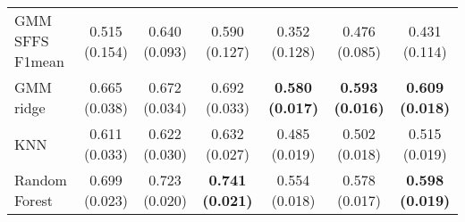 \documentclass[a4paper,10pt,DIV=16]{scrartcl}
\begin{document}
\begin{table}[!t]
\begin{tabular}{lcccccc}
            GMM SFFS F1mean & 0.515 (0.154) & 0.640 (0.093) & 0.590 (0.127) & 0.352 (0.128) & 0.476 (0.085) & 0.431 (0.114) \\
            GMM ridge &       0.665 (0.038) & 0.672 (0.034) & 0.692 (0.033) & {\bfseries 0.580 (0.017)} & {\bfseries 0.593 (0.016)} & {\bfseries 0.609 (0.018)} \\
            KNN &             0.611 (0.033) & 0.622 (0.030) & 0.632 (0.027) & 0.485 (0.019) & 0.502 (0.018) & 0.515 (0.019) \\
            Random Forest &   0.699 (0.023) & 0.723 (0.020) & {\bfseries 0.741 (0.021)} & 0.554 (0.018) & 0.578 (0.017) & {\bfseries 0.598 (0.019)} \\
            \bottomrule
        \end{tabular}
    \end{table}
\end{document}
